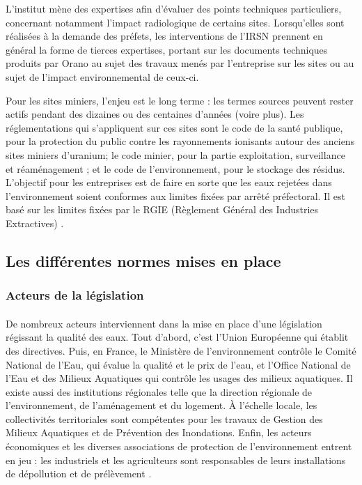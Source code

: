 \documentclass{article}
\begin{document}
L’institut mène des expertises afin d’évaluer des points techniques particuliers, concernant notamment l’impact radiologique de certains sites. Lorsqu’elles sont réalisées à la demande des préfets, les interventions de l’IRSN prennent en général la forme de tierces expertises, portant sur les documents techniques produits par Orano au sujet des travaux menés par l'entreprise sur les sites ou au sujet de l’impact environnemental de ceux-ci.

Pour les sites miniers, l’enjeu est le long terme : les termes sources peuvent rester actifs pendant des dizaines ou des centaines d'années (voire plus). Les réglementations qui s’appliquent sur ces sites sont le code de la santé publique, pour la protection du public contre les rayonnements ionisants autour des anciens sites miniers d’uranium; le code minier, pour la partie exploitation, surveillance et réaménagement ; et le code de l’environnement, pour le stockage des résidus. L’objectif pour les entreprises est de faire en sorte que les eaux rejetées dans l’environnement soient conformes aux limites fixées par arrêté préfectoral. Il est  basé sur les limites fixées par le RGIE (Règlement Général des Industries Extractives) \cite{dublineau_gestion_2020}.


\subsection{Les différentes normes mises en place}%
\subsubsection{Acteurs de la législation}

\paragraph{} De nombreux acteurs interviennent dans la mise en place d’une législation régissant la qualité des eaux. Tout d’abord, c’est l’Union Européenne qui établit des directives. Puis, en France, le  Ministère de l’environnement contrôle le Comité National de l’Eau, qui évalue la qualité et le prix de l’eau, et l’Office National de l’Eau et des Milieux Aquatiques qui contrôle les usages des milieux aquatiques. Il existe aussi des institutions régionales telle que la direction régionale de l’environnement, de l’aménagement et du logement. À l'échelle locale, les collectivités territoriales sont compétentes pour les travaux de Gestion des Milieux Aquatiques et de Prévention des Inondations. Enfin, les acteurs économiques et les diverses associations de protection de l’environnement entrent en jeu : les industriels et les agriculteurs sont responsables de leurs installations de dépollution et de prélèvement \cite{noauthor_quels_nodate-1}.
\end{document}

